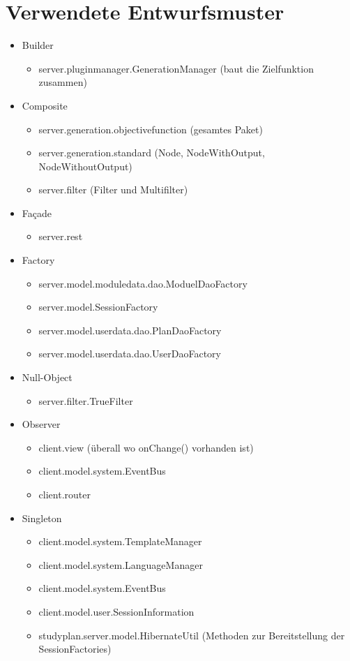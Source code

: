 \section{Verwendete Entwurfsmuster}
\begin{itemize}
	\item Builder
		\begin{itemize}
			\item server.pluginmanager.GenerationManager (baut die Zielfunktion zusammen)
		\end{itemize}
		
	\item Composite
		\begin{itemize}
			\item server.generation.objectivefunction (gesamtes Paket)
			\item server.generation.standard (Node, NodeWithOutput, NodeWithoutOutput)
			\item server.filter (Filter und Multifilter)
		\end{itemize}
		
	\item Façade
		\begin{itemize}
			\item server.rest
		\end{itemize}
	\item Factory
		\begin{itemize}
			\item server.model.moduledata.dao.ModuelDaoFactory
			\item server.model.SessionFactory
			\item server.model.userdata.dao.PlanDaoFactory
			\item server.model.userdata.dao.UserDaoFactory
		\end{itemize}	
	\item Null-Object
		\begin{itemize}
			\item server.filter.TrueFilter
		\end{itemize}
		
	\item Observer
		\begin{itemize}
			\item client.view (überall wo onChange() vorhanden ist)
			\item client.model.system.EventBus
			\item client.router
		\end{itemize}
	
	\item Singleton
		\begin{itemize}
			\item client.model.system.TemplateManager
			\item client.model.system.LanguageManager
			\item client.model.system.EventBus
			\item client.model.user.SessionInformation
			\item studyplan.server.model.HibernateUtil (Methoden zur Bereitstellung der SessionFactories)
		\end{itemize}
	

\end{itemize}
